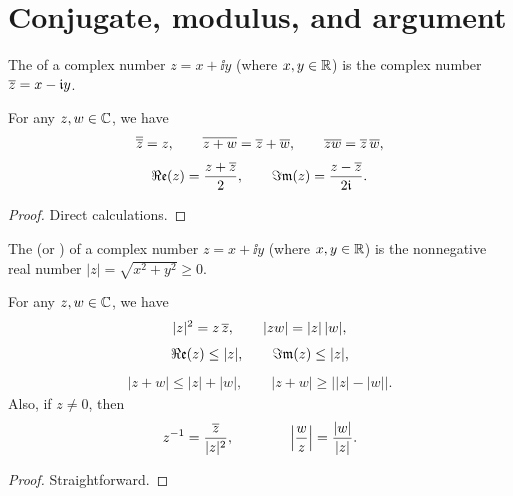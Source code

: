 \section{Conjugate, modulus, and argument}

\begin{definition}
  \label{def:complex_conjugate}
  The  of a complex number $z = x + \ii y$
  (where $x,y \in \mathbb{R}$) is the complex number $\overline{z} = x - \mathfrak{i} y$.
\end{definition}

\begin{lemma}
  \label{lem:complex_conjugate_properties}
  For any $z , w \in \mathbb{C}$, we have
  \begin{align*}
    \overline{\overline{z}} = z , \qquad
    \overline{z + w} = \overline{z} + \overline{w} , \qquad
    \overline{z w} = \overline{z} \, \overline{w} ,
  \end{align*}
  \begin{align*}
    \Re\mathfrak{e} (z) = \frac{z + \overline{z}}{2} , \qquad
    \Im\mathfrak{m} (z) = \frac{z - \overline{z}}{2 \mathfrak{i}} .
  \end{align*}
\end{lemma}
\begin{proof}
  Direct calculations.
\end{proof}

\begin{definition}
  \label{def:absolute_value}
  The  (or ) of a
  complex number $z = x + \ii y$ (where $x,y \in \mathbb{R}$)
  is the nonnegative real number $|z| = \sqrt{x^2 + y^2} \ge 0$.
\end{definition}

\begin{lemma}
  \label{lem:absolute_value_properties}
  For any $z, w \in \mathbb{C}$, we have
  \begin{align*}
    |z|^2 = z \, \overline{z} , \qquad
    |z w| = |z| \, |w| ,
  \end{align*}
  \begin{align*}
    \Re\mathfrak{e}(z) \le |z| , \qquad
    \Im\mathfrak{m}(z) \le |z| ,
  \end{align*}
  \begin{align*}
    |z + w| \le |z| + |w| , \qquad
    |z + w| \ge \big| |z| - |w| \big| .
  \end{align*}
  Also, if $z \ne 0$, then
  \begin{align*}
    z^{-1} = \frac{\overline{z}}{|z|^2} , \qquad
    \qquad
    \Big| \frac{w}{z} \Big| = \frac{|w|}{|z|} .
  \end{align*}
\end{lemma}
\begin{proof}
  Straightforward.
\end{proof}

